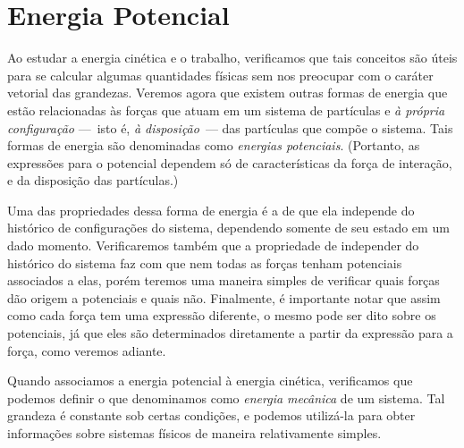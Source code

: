 
\section{Energia Potencial}

Ao estudar a energia cinética e o trabalho, verificamos que tais conceitos são úteis para se calcular algumas quantidades físicas sem nos preocupar com o caráter vetorial das grandezas. Veremos agora que existem outras formas de energia que estão relacionadas às forças que atuam em um sistema de partículas e \emph{à própria configuração} ---~isto é, \emph{à disposição}~--- das partículas que compõe o sistema. Tais formas de energia são denominadas como \emph{energias potenciais}. (Portanto, as expressões para o potencial dependem só de características da força de interação, e da disposição das partículas.)

Uma das propriedades dessa forma de energia é a de que ela independe do histórico de configurações do sistema, dependendo somente de seu estado em um dado momento. Verificaremos também que a propriedade de independer do histórico do sistema faz com que nem todas as forças tenham potenciais associados a elas, porém teremos uma maneira simples de verificar quais forças dão origem a potenciais e quais não. Finalmente, é importante notar que assim como cada força tem uma expressão diferente, o mesmo pode ser dito sobre os potenciais, já que eles são determinados diretamente a partir da expressão para a força, como veremos adiante.


Quando associamos a energia potencial à energia cinética, verificamos que podemos definir o que denominamos como \emph{energia mecânica} de um sistema. Tal grandeza é constante sob certas condições, e podemos utilizá-la para obter informações sobre sistemas físicos de maneira relativamente simples.

